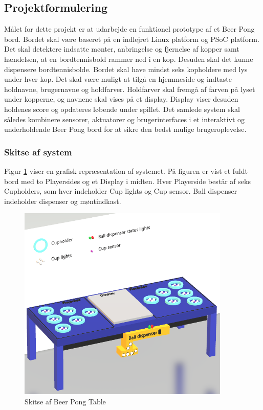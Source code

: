 \documentclass[Rapport/Rapport_main.tex]{subfiles}
\begin{document}
\subsection{Projektformulering}
Målet for dette projekt er at udarbejde en funktionel prototype af et Beer Pong bord. Bordet skal være baseret på en indlejret Linux platform og PSoC platform. Det skal detektere indsatte mønter, anbringelse og fjernelse af kopper samt hændelsen, at en bordtennisbold rammer ned i en kop. Desuden skal det kunne dispensere bordtennisbolde. Bordet skal have mindst seks kopholdere med lys under hver kop. Det skal være muligt at tilgå en hjemmeside og indtaste holdnavne, brugernavne og holdfarver. Holdfarver skal fremgå af farven på lyset under kopperne, og navnene skal vises på et display. Display viser desuden holdenes score og opdateres løbende under spillet. Det samlede system skal således kombinere sensorer, aktuatorer og brugerinterfaces i et interaktivt og underholdende Beer Pong bord for at sikre den bedst mulige brugeroplevelse.

\subsubsection{Skitse af system}
Figur \ref{fig:system_skitse} viser en grafisk repræsentation af systemet. På figuren er vist et fuldt bord med to Playersides og et Display i midten. Hver Playerside består af seks Cupholders, som hver indeholder Cup lights og Cup sensor. Ball dispenser indeholder dispenser og møntindkast.

\begin{figure}[H]
    \centering
    \includegraphics[width=0.9\textwidth]{Rapport/Indledning/graphics/system_skitse.png}
    \caption{Skitse af Beer Pong Table}
    \label{fig:system_skitse}
\end{figure}
\end{document}
